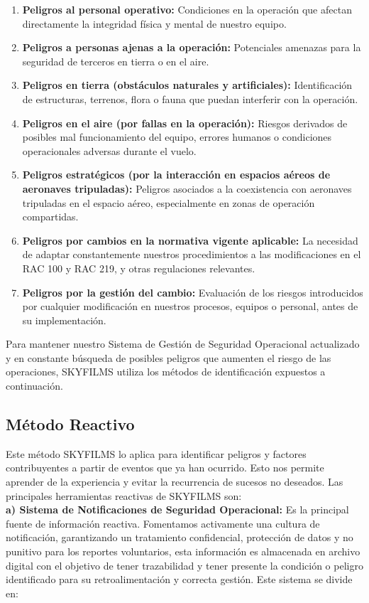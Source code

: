 \begin{enumerate}
    \item \textbf{Peligros al personal operativo:} Condiciones en la operación que afectan directamente la integridad física y mental de nuestro equipo.
    \item \textbf{Peligros a personas ajenas a la operación:} Potenciales amenazas para la seguridad de terceros en tierra o en el aire.
    \item \textbf{Peligros en tierra (obstáculos naturales y artificiales):} Identificación de estructuras, terrenos, flora o fauna que puedan interferir con la operación.
    \item \textbf{Peligros en el aire (por fallas en la operación):} Riesgos derivados de posibles mal funcionamiento del equipo, errores humanos o condiciones operacionales adversas durante el vuelo.
    \item \textbf{Peligros estratégicos (por la interacción en espacios aéreos de aeronaves tripuladas):} Peligros asociados a la coexistencia con aeronaves tripuladas en el espacio aéreo, especialmente en zonas de operación compartidas.
    \item \textbf{Peligros por cambios en la normativa vigente aplicable:} La necesidad de adaptar constantemente nuestros procedimientos a las modificaciones en el RAC 100 y RAC 219, y otras regulaciones relevantes.
    \item \textbf{Peligros por la gestión del cambio:} Evaluación de los riesgos introducidos por cualquier modificación en nuestros procesos, equipos o personal, antes de su implementación.
\end{enumerate}

Para mantener nuestro Sistema de Gestión de Seguridad Operacional actualizado y en constante búsqueda de posibles peligros que aumenten el riesgo de las operaciones, SKYFILMS utiliza los métodos de identificación expuestos a continuación.

\subsection{Método Reactivo}
Este método SKYFILMS lo aplica para identificar peligros y factores contribuyentes a partir de eventos que ya han ocurrido. Esto nos permite aprender de la experiencia y evitar la recurrencia de sucesos no deseados. Las principales herramientas reactivas de SKYFILMS son:\\

\textbf{a) Sistema de Notificaciones de Seguridad Operacional:} Es la principal fuente de información reactiva. Fomentamos activamente una cultura de notificación, garantizando un tratamiento confidencial, protección de datos y no punitivo para los reportes voluntarios, esta información es almacenada en archivo digital con el objetivo de tener trazabilidad y tener presente la condición o peligro identificado para su retroalimentación y correcta gestión. Este sistema se divide en:

